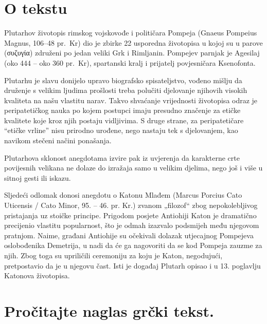 


\section*{O tekstu}

Plutarhov životopis rimskog vojskovođe i političara Pompeja (Gnaeus Pompeius Magnus, 106–48 pr.~Kr) dio je zbirke 22 usporedna životopisa u kojoj su u parove \textgreek[variant=ancient]{(συζυγία)} združeni po jedan veliki Grk i Rimljanin. Pompejev parnjak je Agesilaj (oko 444 – oko 360 pr.~Kr), spartanski kralj i prijatelj povjesničara Ksenofonta. 

Plutarhu je slavu donijelo upravo biografsko spisateljstvo, vođeno mišlju da druženje s velikim ljudima prošlosti treba polučiti djelovanje njihovih visokih kvaliteta na našu vlastitu narav. Takvo shvaćanje vrijednosti životopisa odraz je peripatetičkog nauka po kojem postupci imaju presudno značenje za etičke kvalitete koje kroz njih postaju vidljivima. S druge strane, za peripatetičare ``etičke vrline'' nisu prirodno urođene, nego nastaju tek s djelovanjem, kao navikom stečeni načini ponašanja. 

Plutarhova sklonost anegdotama izvire pak iz uvjerenja da karakterne crte povijesnih velikana ne dolaze do izražaja samo u velikim djelima, nego još i više u sitnoj gesti ili iskazu. 

Sljedeći odlomak donosi anegdotu o Katonu Mlađem (Marcus Porcius Cato Uticensis / Cato Minor, 95. – 46. pr. Kr.) zvanom „filozof“ zbog nepokolebljivog pristajanja uz stoičke principe. Prigodom posjete Antiohiji Katon je dramatično precijenio vlastitu popularnost, što je odmah izazvalo podsmijeh među njegovom pratnjom. Naime, građani Antiohije su očekivali dolazak utjecajnog Pompejeva oslobođenika Demetrija, u nadi da će ga nagovoriti da se kod Pompeja zauzme za njih. Zbog toga su upriličili ceremoniju za koju je Katon, negodujući, pretpostavio da je u njegovu čast. Isti je događaj Plutarh opisao i u 13. poglavlju Katonova životopisa.


\section*{Pročitajte naglas grčki tekst.}


